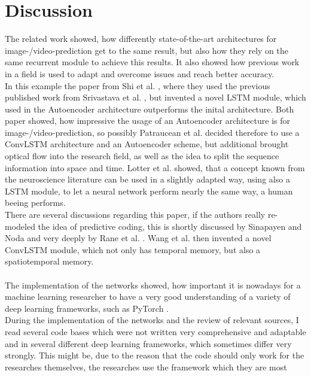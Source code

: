 \section{Discussion} \label{section::discussion}
 The related work showed, how differently state-of-the-art architectures for image-/video-prediction get to the same result, but also how they rely on the same
 recurrent module to achieve this results. It also showed how previous work in a field is used to adapt and overcome issues and reach better accuracy.\\
 In this example the paper from Shi et al. \cite{Shi2015}, where they used the previous published work from Srivastava et al. \cite{Srivastava2015}, but invented 
 a novel LSTM module, which used in the Autoencoder architecture outperforms the inital architecture. Both paper showed, how impressive the usage of an 
 Autoencoder architecture is for image-/video-prediction, so possibly Patraucean et al. \cite{Patraucean2015} decided therefore to use a ConvLSTM architecture and 
 an Autoencoder scheme, but additional brought optical flow into the research field, as well as the idea to split the sequence information into space and time. 
 Lotter et al. \cite{Lotter2016} showed, that a concept known from the neuroscience literature can be used in a slightly adapted way,
 using also a LSTM module, to let a neural network perform nearly the same way, a human beeing performs.\\There are several discussions regarding this paper, if
 the authors really re-modeled the idea of predictive coding, this is shortly discussed by Sinapayen and Noda \cite{Sinapayen2019} and very deeply by Rane et al. 
 \cite{Rane2019}. Wang et al. \cite{Wang2017} then invented a novel ConvLSTM module, which not only has temporal memory, but also a spatiotemporal memory.
 \\\\
 The implementation of the networks showed, how important it is nowadays for a machine learning researcher to have a very good understanding of a variety of deep 
 learning frameworks, such as PyTorch \cite{Paszke2019}.\\During the implementation of the networks and the review of relevant sources,
 I read several code bases which
 were not written very comprehensive and adaptable and in several different deep learning frameworks, which sometimes differ very strongly.
 This might be, due to the reason that the code should only work for the researches themselves, the researches use the framework which they are most
